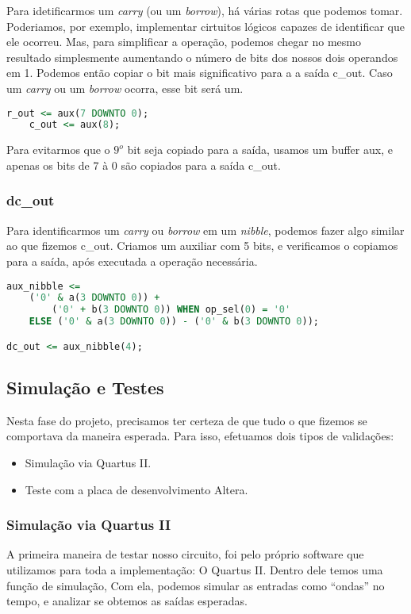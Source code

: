 \documentclass{article}
\begin{document}
Para idetificarmos um \textit{carry} (ou um \textit{borrow}), há várias rotas que podemos tomar. Poderiamos, por exemplo, implementar cirtuitos lógicos capazes de identificar que ele ocorreu. Mas, para simplificar a operação, podemos chegar no mesmo resultado simplesmente aumentando o número de bits dos nossos dois operandos em 1. Podemos então copiar o bit mais significativo para a a saída c\_out. Caso um \textit{carry} ou um \textit{borrow} ocorra, esse bit será um.

\begin{lstlisting}[language=VHDL]
    r_out <= aux(7 DOWNTO 0);
    c_out <= aux(8);
\end{lstlisting}

Para evitarmos que o $9^o$ bit seja copiado para a saída, usamos um buffer aux, e apenas os bits de 7 à 0 são copiados para a saída c\_out.

\subsubsection{dc\_out}

Para identificarmos um \textit{carry} ou \textit{borrow} em um \textit{nibble}, podemos fazer algo similar ao que fizemos c\_out. Criamos um auxiliar com 5 bits, e verificamos o copiamos para a saída, após executada a operação necessária.

\begin{lstlisting}[language=VHDL]
aux_nibble <=
    ('0' & a(3 DOWNTO 0)) +
        ('0' + b(3 DOWNTO 0)) WHEN op_sel(0) = '0' 
	ELSE ('0' & a(3 DOWNTO 0)) - ('0' & b(3 DOWNTO 0));

dc_out <= aux_nibble(4);
\end{lstlisting}

\subsection{Simulação e Testes}
Nesta fase do projeto, precisamos ter certeza de que tudo o que fizemos se comportava da maneira esperada. Para isso, efetuamos dois tipos de validações:

\begin{itemize}
    \item Simulação via Quartus II.
    \item Teste com a placa de desenvolvimento Altera.
\end{itemize}

\subsubsection{Simulação via Quartus II}
A primeira maneira de testar nosso circuito, foi pelo próprio software que utilizamos para toda a implementação: O Quartus II. Dentro dele temos uma função de simulação, Com ela, podemos simular as entradas como ``ondas'' no tempo, e analizar se obtemos as saídas esperadas.
\end{document}
